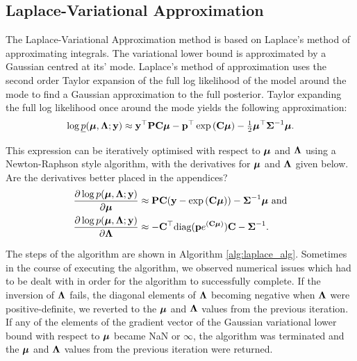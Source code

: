 \documentclass{amsart}[12pt]
\newcommand{\mgc}[1]{{\color{blue}#1}}
\begin{document}
			\subsection{Laplace-Variational Approximation}
			The Laplace-Variational Approximation method is based on Laplace's method of approximating integrals.
			The variational lower bound  is approximated by a Gaussian centred at its' mode. Laplace's method of
			approximation uses the second order Taylor expansion of the full log likelihood of the  model around the
			mode to find a Gaussian approximation to the full posterior. Taylor expanding the full log likelihood
			once around the mode yields the following approximation:
			\begin{align*}
				\log \underline{p}({\boldsymbol \mu}, {\boldsymbol \Lambda}; {\bf y}) \approx {\bf y}^\top{\bf P}{\bf C}{\boldsymbol\mu} - {\bf p}^\top\exp \left ({\bf C} {\boldsymbol \mu} \right ) - \tfrac{1}{2} {\boldsymbol \mu}^\top {\boldsymbol\Sigma}^{-1} {\boldsymbol \mu}. 
			\end{align*}
					
			\noindent This expression can be iteratively optimised with respect to ${\boldsymbol \mu}$ and ${\boldsymbol \Lambda}$ using a Newton-Raphson style algorithm, with the derivatives for ${\boldsymbol \mu}$ and ${\boldsymbol \Lambda}$ given below.
			\mgc{Are the derivatives better placed in the appendices?}
			\begin{align*}
				\frac{\partial \log p({\boldsymbol \mu}, {\boldsymbol \Lambda}; {\bf y})}{\partial {\boldsymbol\mu}}     & \approx {\bf P} {\bf C} ({\bf y} - \exp{({\bf C}{\boldsymbol\mu})}) - {\boldsymbol \Sigma}^{-1} {\boldsymbol \mu} \text{ and} \\
				\frac{\partial \log p({\boldsymbol \mu}, {\boldsymbol \Lambda}; {\bf y})}{\partial {\boldsymbol\Lambda}} & \approx - {\bf C}^\top \text{diag}({\bf p} e^{({\bf C} {\boldsymbol \mu})}) {\bf C} - {\boldsymbol \Sigma}^{-1}.   
			\end{align*}
					
			\noindent The steps of the algorithm are shown in Algorithm \ref{alg:laplace_alg}. Sometimes in the course of	executing the algorithm, we observed numerical issues which had to be dealt with in order for the
			algorithm to successfully complete.
			If the inversion  of ${\boldsymbol \Lambda}$ fails, the diagonal elements of
			${\boldsymbol \Lambda}$ becoming negative when ${\boldsymbol \Lambda}$ were positive-definite, we reverted to the ${\boldsymbol \mu}$ and
			${\boldsymbol \Lambda}$ values from the previous iteration. If any of the elements of the gradient vector of the
			Gaussian variational lower bound with respect to ${\boldsymbol \mu}$ became NaN or $\infty$, the algorithm was
			terminated and the ${\boldsymbol \mu}$ and ${\boldsymbol \Lambda}$ values from the previous iteration were returned.
					
\end{document}
